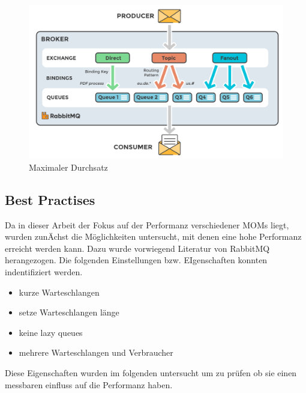 \begin{figure}
\center
  \includegraphics[width=1\textwidth]{images/rmq_architecture.png}
  \caption{Maximaler Durchsatz}
  \label{img:rmq_architecture}
\end{figure}
\subsection{Best Practises}
Da in dieser Arbeit der Fokus auf der Performanz verschiedener MOMs liegt, wurden zunÄchst die Möglichkeiten untersucht, mit denen eine hohe Performanz erreicht werden kann. Dazu wurde vorwiegend Literatur von RabbitMQ herangezogen. Die folgenden Einstellungen bzw. EIgenschaften konnten indentifiziert werden.
\begin{itemize}
    \item kurze Warteschlangen
    \item setze Warteschlangen länge
    \item keine lazy queues
    \item mehrere Warteschlangen und Verbraucher
\end{itemize}
Diese Eigenschaften wurden im folgenden untersucht um zu prüfen ob sie einen messbaren einfluss auf die Performanz haben.

